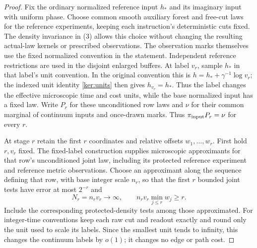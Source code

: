 \begin{proof}
Fix the ordinary normalized reference input
\(h_*\) and its imaginary input with uniform phase. Choose common
smooth auxiliary forest and free-cut laws for the reference
experiments, keeping each instruction's deterministic cuts fixed.
The density invariance in (3)
allows this choice without changing the resulting actual-law kernels
or prescribed observations. The observation marks themselves use the
fixed normalized convention in the statement. Independent reference restrictions
are used in the disjoint enlarged buffers.  At label \(v_r\), sample
\(h_*\) in that label's unit convention.  In the original convention
this is \(h=h_*+\gamma^{-1}\log v_r\); the indexed unit identity
\eqref{ker:units} then gives \(h_{v_r}=h_*\).  Thus the label changes
the effective microscopic time and cost units, while the base
normalized input has a fixed law.
Write \(P_r\) for these unconditioned row laws and \(\nu\) for
their common marginal of continuum inputs and once-drawn marks.
Thus \(\pi_{\rm input}P_r=\nu\) for every \(r\).

At stage \(r\) retain the first \(r\) coordinates and relative
offsets \(w_1,\ldots,w_r\).  First hold \(r,v_r\) fixed.  The
fixed-label construction supplies microscopic approximants for that
row's unconditioned joint law, including its protected reference
experiment and reference metric observations.  Choose an approximant
along the sequence defining that row, with base integer scale
\(n_r\), so that the first \(r\) bounded joint
tests have error at most \(2^{-r}\) and
\[
 N_r=n_rv_r\longrightarrow\infty,\qquad
 n_rv_r\min_{j\le r}w_j\ge r.
\]
Include the corresponding protected-density tests among those
approximated.  For integer-time conventions keep each raw cut and readout exactly and
round only the unit used to scale its labels.  Since the smallest
unit tends to infinity, this changes the continuum labels by
\(o(1)\); it changes no edge or path cost.


\end{proof}
